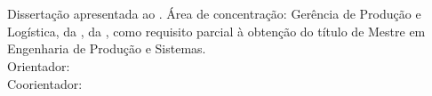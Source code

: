 \begin{center}
    {\singlespacing
    \MakeUppercase{\textbf{\aluno}} \\ [5cm]

    \MakeUppercase{\titulo} \\ [1cm]
    
    \hspace{.45\textwidth} %
        \begin{minipage}{.5\textwidth}
        \noindent Dissertação apresentada ao \curso. Área de concentração: Gerência de Produção e Logística, da \departamento, da \universidade, como requisito parcial à obtenção do título de Mestre em Engenharia de Produção e Sistemas. \\ [5mm]
        \noindent Orientador: \orientador \\
        \noindent Coorientador: \coorientador
        \end{minipage}
    
    \vfill
    
    \MakeUppercase{\cidade} \\ 
    \ano}
\end{center}